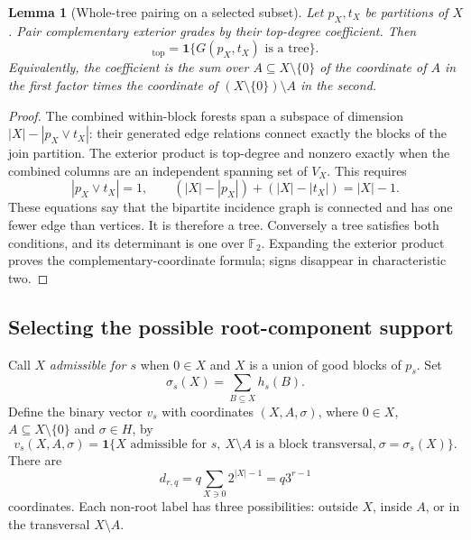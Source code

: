 \documentclass[11pt,letterpaper]{article}
\newtheorem{lemma}[theorem]{Lemma}
\theoremstyle{definition}
\newcommand{\F}{\mathbb F}
\newcommand{\ind}[1]{\mathbf 1\{#1\}}
\begin{document}
\begin{lemma}[Whole-tree pairing on a selected subset]\label{lem:wholepair}
Let $p_X,t_X$ be partitions of $X$. Pair complementary exterior grades by their top-degree coefficient. Then
\begin{equation}
 [\omega(p_X)\wedge\omega(t_X)]_{\mathrm{top}}
 =\ind{G(p_X,t_X)\text{ is a tree}}.\label{eq:wholepair}
\end{equation}
Equivalently, the coefficient is the sum over $A\subseteq X\setminus\{0\}$ of the coordinate of $A$ in the first factor times the coordinate of $(X\setminus\{0\})\setminus A$ in the second.
\end{lemma}
\begin{proof}
The combined within-block forests span a subspace of dimension $|X|-|p_X\vee t_X|$: their generated edge relations connect exactly the blocks of the join partition. The exterior product is top-degree and nonzero exactly when the combined columns are an independent spanning set of $V_X$. This requires
\[
 |p_X\vee t_X|=1,\qquad (|X|-|p_X|)+(|X|-|t_X|)=|X|-1.
\]
These equations say that the bipartite incidence graph is connected and has one fewer edge than vertices. It is therefore a tree. Conversely a tree satisfies both conditions, and its determinant is one over $\F_2$. Expanding the exterior product proves the complementary-coordinate formula; signs disappear in characteristic two.
\end{proof}

\subsection{Selecting the possible root-component support}
Call $X$ \emph{admissible for $s$} when $0\in X$ and $X$ is a union of good blocks of $p_s$. Set
\[
 \sigma_s(X)=\sum_{B\subseteq X}h_s(B).
\]
Define the binary vector $v_s$ with coordinates $(X,A,\sigma)$, where $0\in X$, $A\subseteq X\setminus\{0\}$ and $\sigma\in H$, by
\begin{equation}
 v_s(X,A,\sigma)=\ind{X\text{ admissible for }s,\ X\setminus A\text{ is a block transversal,}\
                          \sigma=\sigma_s(X)}.\label{eq:feature}
\end{equation}
There are
\begin{equation}
 d_{r,q}=q\sum_{X\ni0}2^{|X|-1}=q3^{r-1}\label{eq:dimension}
\end{equation}
coordinates. Each non-root label has three possibilities: outside $X$, inside $A$, or in the transversal $X\setminus A$.
\end{document}

